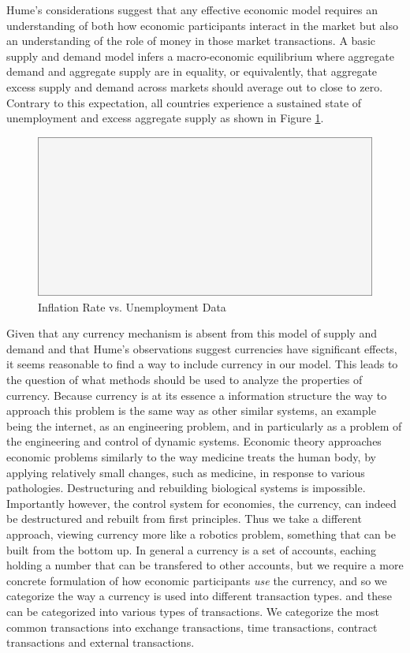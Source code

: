 Hume's considerations suggest that any effective economic model requires an understanding of both
how economic participants interact in the market but also an understanding of the role of money in
those market transactions. A basic supply and demand model infers a macro-economic equilibrium where
aggregate demand and aggregate supply are in equality, or equivalently, that aggregate excess supply
and demand across markets should average out to close to zero. Contrary to this expectation, all
countries experience a sustained state of unemployment and excess aggregate supply as shown in
Figure \ref{fig:ui_all_data}.

\begin{figure}[H]
\centering
\includegraphics[scale=0.48]{blank}
\caption{Inflation Rate vs. Unemployment Data}
\label{fig:ui_all_data}
\end{figure}

Given that any currency mechanism is absent from this model of supply and demand and that Hume's
observations suggest currencies have significant effects, it seems reasonable to find a way to
include currency in our model. This leads to the question of what methods should be used to analyze
the properties of currency. Because currency is at its essence a information structure the way to
approach this problem is the same way as other similar systems, an example being the internet, as an
engineering problem, and in particularly as a problem of the engineering and control of dynamic
systems. Economic theory approaches economic problems similarly to the way medicine treats the human
body, by applying relatively small changes, such as medicine, in response to various pathologies.
Destructuring and rebuilding biological systems is impossible. Importantly however, the control
system for economies, the currency, can indeed be destructured and rebuilt from first principles.
Thus we take a different approach, viewing currency more like a robotics problem, something that can
be built from the bottom up. In general a currency is a set of accounts, eaching holding a number
that can be transfered to other accounts, but we require a more concrete formulation of how economic
participants \textit{use} the currency, and so we categorize the way a currency is used into
different transaction types.  and these can be categorized into various types of transactions. We
categorize the most common transactions into exchange transactions, time transactions, contract
transactions and external transactions.

